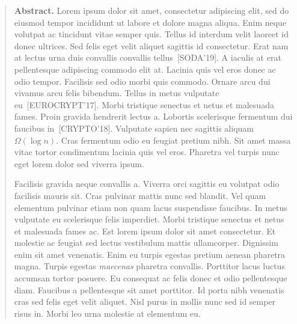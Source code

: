 \begin{quotation}
\small

\noindent\textbf{Abstract.} Lorem ipsum dolor sit amet, consectetur adipiscing
elit, sed do eiusmod tempor incididunt ut labore et dolore magna aliqua. Enim
neque volutpat ac tincidunt vitae semper quis. Tellus id interdum velit laoreet
id donec ultrices. Sed felis eget velit aliquet sagittis id consectetur. Erat
nam at lectus urna duis convallis convallis tellus~[SODA'19]. A iaculis at erat
pellentesque adipiscing commodo elit at. Lacinia quis vel eros donec ac odio
tempor. Facilisis sed odio morbi quis commodo. Ornare arcu dui vivamus arcu
felis bibendum. Tellus in metus vulputate eu~[EUROCRYPT'17]. Morbi tristique
senectus et netus et malesuada fames. Proin gravida hendrerit lectus a.
Lobortis scelerisque fermentum dui faucibus in~[CRYPTO'18]. Vulputate sapien
nec sagittis aliquam $\Omega(\log n)$. Cras fermentum odio eu feugiat pretium
nibh. Sit amet massa vitae tortor condimentum lacinia quis vel eros. Pharetra
vel turpis nunc eget lorem dolor sed viverra ipsum.

\noindent Facilisis gravida neque convallis a. Viverra orci sagittis eu
volutpat odio facilisis mauris sit. Cras pulvinar mattis nunc sed blandit. Vel
quam elementum pulvinar etiam non quam lacus suspendisse faucibus. In metus
vulputate eu scelerisque felis imperdiet. Morbi tristique senectus et netus et
malesuada fames ac. Est lorem ipsum dolor sit amet consectetur. Et molestie ac
feugiat sed lectus vestibulum mattis ullamcorper. Dignissim enim sit amet
venenatis.  Enim eu turpis egestas pretium aenean pharetra magna. Turpis
egestas \textit{maecenas} pharetra convallis. Porttitor lacus luctus accumsan
tortor posuere. Eu consequat ac felis donec et odio pellentesque diam. Faucibus
a pellentesque sit amet porttitor. Id porta nibh venenatis cras sed felis eget
velit aliquet. Nisl purus in mollis nunc sed id semper risus in. Morbi leo urna
molestie at elementum eu.
\end{quotation}
